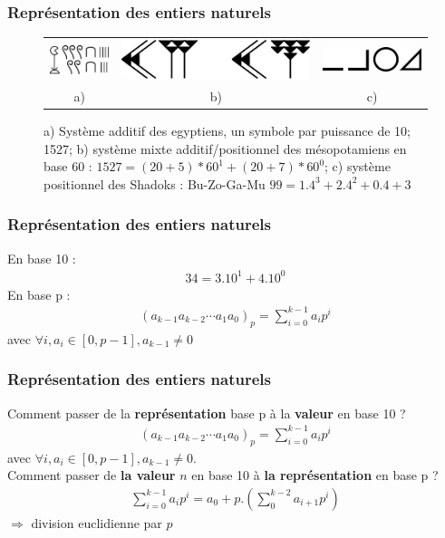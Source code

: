 \documentclass{beamer}
\begin{document}
\begin{frame}
\frametitle{Représentation des entiers naturels}
\begin{figure}[htbp]
\begin{tabular}{ccc}
\includegraphics[width=0.25\linewidth]{Figs/Egypte/1527.pdf}&
\includegraphics[width=0.45\linewidth]{Figs/Mesopotamie/1527.pdf}&
\includegraphics[width=0.25\linewidth]{Figs/Shadock/dessin.pdf}\\
a) & b) & c)
\end{tabular}
\caption{a) Système additif des egyptiens, un symbole par puissance de 10; 1527; b) système mixte additif/positionnel des mésopotamiens en base 60 : $1527 = (20 + 5) * 60^1 + (20 + 7) * 60^0$; c) système positionnel des Shadoks : Bu-Zo-Ga-Mu $99 = 1.4^3 + 2.4^2 + 0.4 + 3$}
\end{figure}
\end{frame}

\begin{frame}
\frametitle{Représentation des entiers naturels}
En base 10 : 
\begin{eqnarray*}
34 = 3. 10^1 + 4. 10^0
\end{eqnarray*}
En base p : 
\begin{eqnarray*}
(a_{k-1}a_{k-2}\cdots a_{1}a_{0})_p = \sum_{i=0}^{k-1} a_i p^i
\end{eqnarray*}
avec $\forall i, a_i \in [0, p-1], a_{k-1} \neq 0$
\end{frame}

\begin{frame}
\frametitle{Représentation des entiers naturels}
Comment passer de la \textbf{représentation} base p à la \textbf{valeur} en base 10 ? 
\begin{eqnarray*}
(a_{k-1}a_{k-2}\cdots a_{1}a_{0})_p = \sum_{i=0}^{k-1} a_i p^i
\end{eqnarray*}
avec $\forall i, a_i \in [0, p-1], a_{k-1} \neq 0$. \\

Comment passer de \textbf{la valeur} $n$ en base 10 à \textbf{la représentation} en base p ? 
\begin{eqnarray*}
\sum_{i=0}^{k-1} a_i p^i = a_0 + p.(\sum_{0}^{k-2} a_{i+1} p^i)
\end{eqnarray*}
$\Rightarrow$ division euclidienne par $p$
\end{frame}
\end{document}
